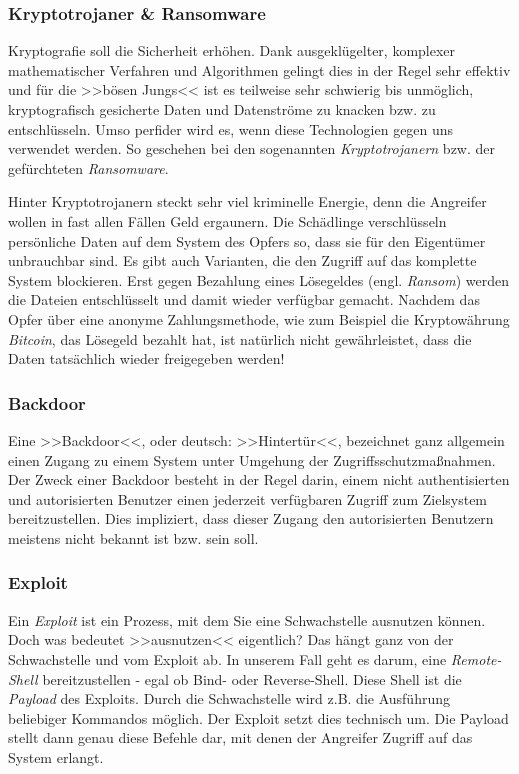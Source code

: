 \subsubsection{Kryptotrojaner \& Ransomware}
\label{sec:Ransomware}

Kryptografie soll die Sicherheit erhöhen. Dank ausgeklügelter, komplexer mathematischer Verfahren und Algorithmen gelingt dies in der Regel sehr effektiv und für die >>bösen Jungs<< ist es teilweise sehr schwierig bis unmöglich, kryptografisch gesicherte Daten und Datenströme zu knacken bzw. zu entschlüsseln. Umso perfider wird es, wenn diese Technologien gegen uns verwendet werden. So geschehen bei den sogenannten \textit{Kryptotrojanern} bzw. der gefürchteten \textit{Ransomware}.

Hinter Kryptotrojanern steckt sehr viel kriminelle Energie, denn die Angreifer wollen in fast allen Fällen Geld ergaunern. Die Schädlinge verschlüsseln persönliche Daten auf dem System des Opfers so, dass sie für den Eigentümer unbrauchbar sind. Es gibt auch Varianten, die den Zugriff auf das komplette System blockieren. Erst gegen Bezahlung eines Lösegeldes (engl. \textit{Ransom}) werden die Dateien entschlüsselt und damit wieder verfügbar gemacht. Nachdem das Opfer über eine anonyme Zahlungsmethode, wie zum Beispiel die Kryptowährung \textit{Bitcoin}, das Lösegeld bezahlt hat, ist natürlich nicht gewährleistet, dass die Daten tatsächlich wieder freigegeben werden!

\subsubsection{Backdoor}
\label{sec:Backdoor}

Eine >>Backdoor<<, oder deutsch: >>Hintertür<<, bezeichnet ganz allgemein einen Zugang zu einem System unter Umgehung der Zugriffsschutzmaßnahmen. Der Zweck einer Backdoor besteht in der Regel darin, einem nicht authentisierten und autorisierten Benutzer einen jederzeit verfügbaren Zugriff zum Zielsystem bereitzustellen. Dies impliziert, dass dieser Zugang den autorisierten Benutzern meistens nicht bekannt ist bzw. sein soll.


\subsubsection{Exploit}
\label{sec:Exploit}

Ein \textit{Exploit} ist ein Prozess, mit dem Sie eine Schwachstelle ausnutzen können. Doch was bedeutet >>ausnutzen<< eigentlich? Das hängt ganz von der Schwachstelle und vom Exploit ab. In unserem Fall geht es darum, eine \textit{Remote-Shell} bereitzustellen - egal ob Bind- oder Reverse-Shell. Diese Shell ist die \textit{Payload} des Exploits. Durch die Schwachstelle wird z.B. die Ausführung beliebiger Kommandos möglich. Der Exploit setzt dies technisch um. Die Payload stellt dann genau diese Befehle dar, mit denen der Angreifer Zugriff auf das System erlangt.

